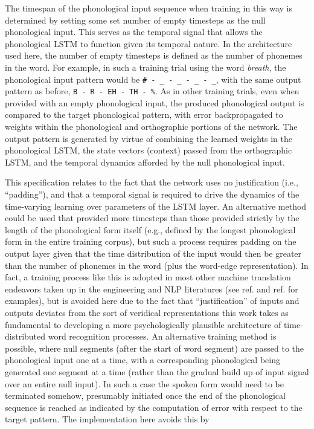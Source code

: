 \documentclass[
  american,
  man,floatsintext]{apa6}
\begin{document}
The timespan of the phonological input sequence when training in this way is determined by setting some set number of empty timesteps as the null phonological input. This serves as the temporal signal that allows the phonological LSTM to function given its temporal nature. In the architecture used here, the number of empty timesteps is defined as the number of phonemes in the word. For example, in such a training trial using the word \emph{breath}, the phonological input pattern would be \texttt{\#\ -\ \_\ -\ \_\ -\ \_\ -\ \_}, with the same output pattern as before, \texttt{B\ -\ R\ -\ EH\ -\ TH\ -\ \%}. As in other training trials, even when provided with an empty phonological input, the produced phonological output is compared to the target phonological pattern, with error backpropagated to weights within the phonological and orthographic portions of the network. The output pattern is generated by virtue of combining the learned weights in the phonological LSTM, the state vectors (context) passed from the orthographic LSTM, and the temporal dynamics afforded by the null phonological input.

This specification relates to the fact that the network uses no justification (i.e., ``padding''), and that a temporal signal is required to drive the dynamics of the time-varying learning over parameters of the LSTM layer. An alternative method could be used that provided more timesteps than those provided strictly by the length of the phonological form itself (e.g., defined by the longest phonological form in the entire training corpus), but such a process requires padding on the output layer given that the time distribution of the input would then be greater than the number of phonemes in the word (plus the word-edge representation). In fact, a training process like this is adopted in most other machine translation endeavors taken up in the engineering and NLP literatures (see ref. and ref. for examples), but is avoided here due to the fact that ``justification'' of inputs and outputs deviates from the sort of veridical representations this work takes as fundamental to developing a more psychologically plausible architecture of time-distributed word recognition processes. An alternative training method is possible, where null segments (after the start of word segment) are passed to the phonological input one at a time, with a corresponding phonological being generated one segment at a time (rather than the gradual build up of input signal over an entire null input). In such a case the spoken form would need to be terminated somehow, presumably initiated once the end of the phonological sequence is reached as indicated by the computation of error with respect to the target pattern. The implementation here avoids this by
\end{document}
